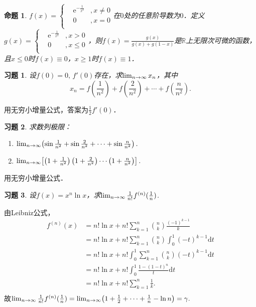 \documentclass[11pt,a4paper]{ctexart}
\makeatletter
\theoremstyle{thmseries} %
\newtheorem{prop}{命题}[section]
\theoremstyle{exerseries}
\newtheorem{exer}{习题}[section]
\renewenvironment{proof}[1][\proofname]{\par
  \pushQED{\qed}%
  \normalfont \topsep6\p@\@plus6\p@\relax
  \trivlist
  \item[\hskip\labelsep
        \itshape
    #1\@addpunct{}]\ignorespaces
}{%
  \popQED\endtrivlist\@endpefalse
}
\newenvironment{sol}{\begin{proof}[\bfseries\upshape 解\quad]}{\end{proof}}
\newcommand{\bra}[1]{\mathopen{}\left(#1\right)}
\newcommand{\sbra}[1]{\mathopen{}\left[#1\right]}
\newcommand{\R}{\mathbb{R}}
\renewcommand{\d}{\mathrm{d}}
\newcommand{\e}{\mathrm{e}}
\def \nti {\mathnormal{n}\to\infty}
\makeatother
\begin{document}
\begin{prop}
	$f(x)=\left\{\begin{aligned}
		&\e^{-\frac{1}{x^2}}&,x\neq0\\
		&0&,x=0\\
	\end{aligned}\right.$在$0$处的任意阶导数为$0$．定义$g(x)=\left\{\begin{aligned}
		&\e^{-\frac{1}{x^2}}&,x>0\\
		&0&,x\leq0\\
	\end{aligned}\right.$，则$f(x)=\frac{g(x)}{g(x)+g(1-x)}$是$\R$上无限次可微的函数，且$x\leq0$时$f(x)\equiv0$，$x\geq1$时$f(x)\equiv1$．
\end{prop}

\begin{exer}
	设$f(0)=0,\,f'(0)$存在，求$\lim_{\nti}x_n$，其中
	\[x_n=f\bra{\frac{1}{n^2}}+f\bra{\frac{2}{n^2}}+\cdots+f\bra{\frac{n}{n^2}}.\]
\end{exer}
\begin{sol}
	用无穷小增量公式，答案为$\frac{1}{2}f'(0)$．
\end{sol}

\begin{exer}
	求数列极限：
	\begin{enumerate}
		\item $\lim_{\nti}\bra{\sin\frac{1}{n^2}+\sin\frac{2}{n^2}+\cdots+\sin\frac{n}{n^2}}.$
		\item $\lim_{\nti}\sbra{\bra{1+\frac{1}{n^2}}\bra{1+\frac{2}{n^2}}\cdots\bra{1+\frac{n}{n^2}}}.$
	\end{enumerate}
\end{exer}
\begin{sol}
	用无穷小增量公式．
\end{sol}

\begin{exer}
	设$f(x)=x^n\ln x$，求$\lim_{\nti}\frac{1}{n!}f^{(n)}(\frac{1}{n})$.
\end{exer}
\begin{sol}
	由Leibniz公式，
	\begin{align*}
		f^{(n)}(x)&=n!\ln x+n!\sum_{k=1}^{n}\binom{n}{k}\frac{(-1)^{k-1}}{k}\\
		&=n!\ln x+n!\sum_{k=1}^{n}\binom{n}{k}\int_{0}^{1}(-t)^{k-1}\d t\\
		&=n!\ln x+n!\int_{0}^{1}\sum_{k=1}^{n}\binom{n}{k}(-t)^{k-1}\d t\\
		&=n!\ln x+n!\int_{0}^{1}\frac{1-(1-t)^n}{t}\d t\\
		&=n!\ln x+n!\sum_{k=1}^{n}\frac{1}{k}.\\
	\end{align*}
	故$\lim_{\nti}\frac{1}{n!}f^{(n)}(\frac{1}{n})=\lim_{\nti}\bra{1+\frac{1}{2}+\cdots+\frac{1}{n}-\ln n}=\gamma.$
\end{sol}
\end{document}
